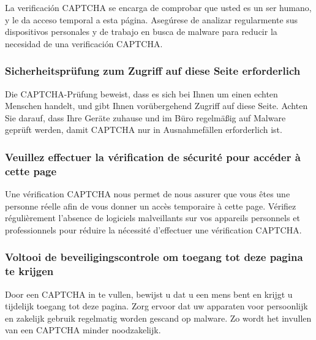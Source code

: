 La verificación CAPTCHA se encarga de comprobar que usted es un ser
humano, y le da acceso temporal a esta página. Asegúrese de analizar
regularmente sus dispositivos personales y de trabajo en busca de
malware para reducir la necesidad de una verificación CAPTCHA.

\hypertarget{sicherheitspruxfcfung-zum-zugriff-auf-diese-seite-erforderlich}{%
\subsubsection{Sicherheitsprüfung zum Zugriff auf diese Seite
erforderlich}\label{sicherheitspruxfcfung-zum-zugriff-auf-diese-seite-erforderlich}}

Die CAPTCHA-Prüfung beweist, dass es sich bei Ihnen um einen echten
Menschen handelt, und gibt Ihnen vorübergehend Zugriff auf diese Seite.
Achten Sie darauf, dass Ihre Geräte zuhause und im Büro regelmäßig auf
Malware geprüft werden, damit CAPTCHA nur in Ausnahmefällen erforderlich
ist.

\hypertarget{veuillez-effectuer-la-vuxe9rification-de-suxe9curituxe9-pour-accuxe9der-uxe0-cette-page}{%
\subsubsection{Veuillez effectuer la vérification de sécurité pour
accéder à cette
page}\label{veuillez-effectuer-la-vuxe9rification-de-suxe9curituxe9-pour-accuxe9der-uxe0-cette-page}}

Une vérification CAPTCHA nous permet de nous assurer que vous êtes une
personne réelle afin de vous donner un accès temporaire à cette page.
Vérifiez régulièrement l'absence de logiciels malveillants sur vos
appareils personnels et professionnels pour réduire la nécessité
d'effectuer une vérification CAPTCHA.

\hypertarget{voltooi-de-beveiligingscontrole-om-toegang-tot-deze-pagina-te-krijgen}{%
\subsubsection{Voltooi de beveiligingscontrole om toegang tot deze
pagina te
krijgen}\label{voltooi-de-beveiligingscontrole-om-toegang-tot-deze-pagina-te-krijgen}}

Door een CAPTCHA in te vullen, bewijst u dat u een mens bent en krijgt u
tijdelijk toegang tot deze pagina. Zorg ervoor dat uw apparaten voor
persoonlijk en zakelijk gebruik regelmatig worden gescand op malware. Zo
wordt het invullen van een CAPTCHA minder noodzakelijk.

